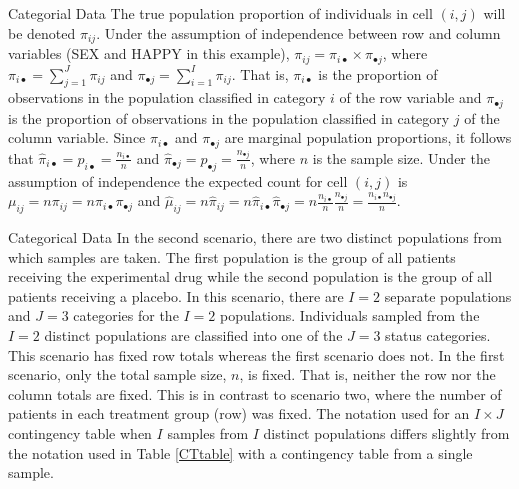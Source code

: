 \documentclass[
  ignorenonframetext,
]{beamer}
\begin{document}
\begin{frame}{Categorial Data}
\label{categorial-data}
The true population proportion of individuals in cell \((i, j)\) will be
denoted \(\pi_{ij}\). Under the assumption of independence between row
and column variables (SEX and HAPPY in this example),
\(\pi_{ij}=\pi_{i\bullet} \times \pi_{\bullet j}\), where
\(\pi_{i\bullet}=\sum_{j=1}^{J} \pi_{ij}\) and
\(\pi_{\bullet j}=\sum_{i=1}^{I} \pi_{ij}\). That is, \(\pi_{i\bullet}\)
is the proportion of observations in the population classified in
category \(i\) of the row variable and \(\pi_{\bullet j}\) is the
proportion of observations in the population classified in category
\(j\) of the column variable. Since \(\pi_{i\bullet}\) and
\(\pi_{\bullet j}\) are marginal population proportions, it follows that
\(\hat\pi_{i\bullet}=p_{i\bullet}=\frac{n_{i\bullet}}{n}\) and
\(\hat\pi_{\bullet j}=p_{\bullet j}=\frac{n_{\bullet j}}{n}\), where
\(n\) is the sample size. Under the assumption of independence the
expected count for cell \((i, j)\) is
\(\mu_{ij}= n \pi_{ij}=n \pi_{i\bullet}\pi_{\bullet j}\) and
\(\hat\mu_{ij}=n\hat\pi_{ij} = n\hat\pi_{i\bullet} \hat\pi_{\bullet j} = n \frac{n_{i\bullet}}{n}\frac{n_{\bullet j}}{n} = \frac{n_{i\bullet}n_{\bullet j}}{n}.\)
\end{frame}

\begin{frame}{Categorical Data}
\label{categorical-data-3}
In the second scenario, there are two distinct populations from which
samples are taken. The first population is the group of all patients
receiving the experimental drug while the second population is the group
of all patients receiving a placebo. In this scenario, there are \(I=2\)
separate populations and \(J=3\) categories for the \(I=2\) populations.
Individuals sampled from the \(I=2\) distinct populations are classified
into one of the \(J=3\) status categories. This scenario has fixed row
totals whereas the first scenario does not. In the first scenario, only
the total sample size, \(n\), is fixed. That is, neither the row nor the
column totals are fixed. This is in contrast to scenario two, where the
number of patients in each treatment group (row) was fixed. The notation
used for an \(I \times J\) contingency table when \(I\) samples from
\(I\) distinct populations differs slightly from the notation used in
Table \ref{CTtable} with a contingency table from a single sample.
\end{frame}
\end{document}
